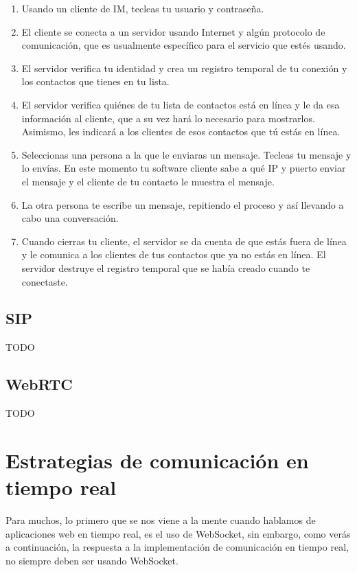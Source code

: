 \begin{enumerate}
  \item Usando un cliente de IM, tecleas tu usuario y contraseña.
  \item El cliente se conecta a un servidor usando Internet y algún protocolo de comunicación, que es usualmente específico para el servicio que estés usando.
  \item El servidor verifica tu identidad y crea un registro temporal de tu conexión y los contactos que tienes en tu lista.
  \item El servidor verifica quiénes de tu lista de contactos está en línea y le da esa información al cliente, que a su vez hará lo necesario para mostrarlos. Asimismo, les indicará a los clientes de esos contactos que tú estás en línea.
  \item Seleccionas una persona a la que le enviaras un mensaje. Tecleas tu mensaje y lo envías. En este momento tu software cliente sabe a qué IP y puerto enviar el mensaje y el cliente de tu contacto le muestra el mensaje.
  \item La otra persona te escribe un mensaje, repitiendo el proceso y así llevando a cabo una conversación.
  \item Cuando cierras tu cliente, el servidor se da cuenta de que estás fuera de línea y le comunica a los clientes de tus contactos que ya no estás en línea. El servidor destruye el registro temporal que se había creado cuando te conectaste.
\end{enumerate}

\subsection{SIP}

TODO

\subsection{WebRTC}

TODO

\clearpage

\section{Estrategias de comunicación en tiempo real}

Para muchos, lo primero que se nos viene a la mente cuando hablamos de aplicaciones web en tiempo real, es el uso de WebSocket, sin embargo, como verás a continuación, la respuesta a la implementación de comunicación en tiempo real, no siempre deben ser usando WebSocket.

